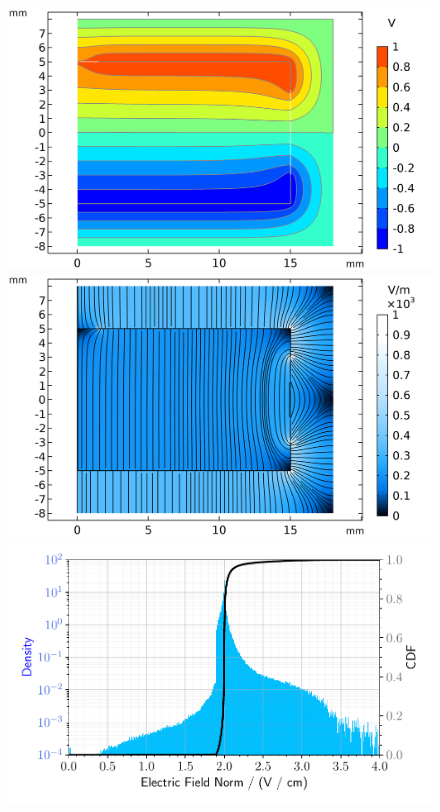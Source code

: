 \begin{figure}
\begin{minipage}{0.49\textwidth}
\centering
\includegraphics[scale=0.5]{Figures/Electrodes/pl38_potential.png}
\includegraphics[scale=0.5]{Figures/Electrodes/pl38_enorm.png}
\includegraphics[scale=0.5]{Figures/Electrodes/pl38_enorm_hist.pdf}

\end{minipage}
\end{figure}
